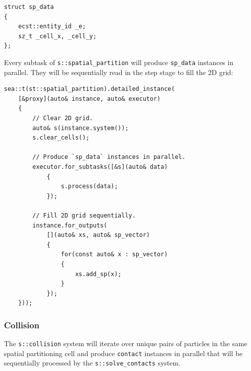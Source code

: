 \documentclass[twoside, 12pt, a4paper, openany]{book}
\begin{document}
\begin{verbatim}
struct sp_data
{
    ecst::entity_id _e;
    sz_t _cell_x, _cell_y;
};
\end{verbatim}

Every subtask of
\texttt{s::spatial_partition}
will produce
\texttt{sp_data}
instances in parallel. They will be sequentially read in the step stage
to fill the 2D grid:

\begin{verbatim}
sea::t(st::spatial_partition).detailed_instance(
    [&proxy](auto& instance, auto& executor)
    {
        // Clear 2D grid.
        auto& s(instance.system());
        s.clear_cells();

        // Produce `sp_data` instances in parallel.
        executor.for_subtasks([&s](auto& data)
            {
                s.process(data);
            });

        // Fill 2D grid sequentially.
        instance.for_outputs(
            [](auto& xs, auto& sp_vector)
            {
                for(const auto& x : sp_vector)
                {
                    xs.add_sp(x);
                }
            });
    }));
\end{verbatim}

\subsubsection{Collision}\label{collision}

The
\texttt{s::collision}
system will iterate over unique pairs of particles in the same spatial
partitioning cell and produce
\texttt{contact}
instances in parallel that will be sequentially processed by the
\texttt{s::solve_contacts}
system.
\end{document}
